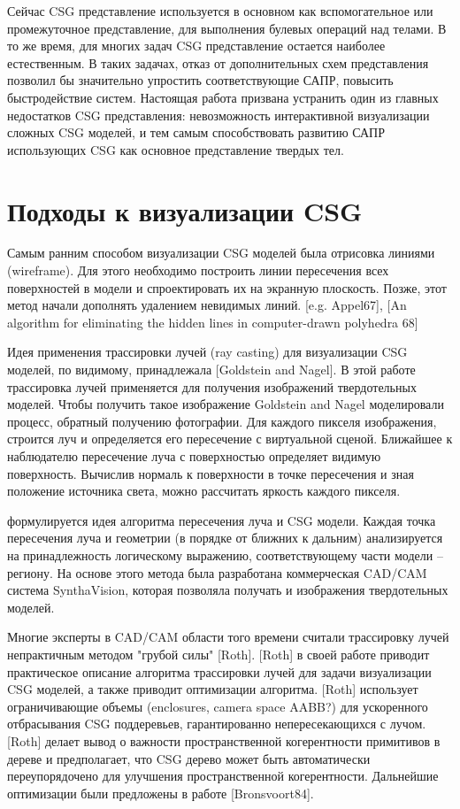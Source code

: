 {{{{{{Сейчас CSG представление используется в основном как вспомогательное или промежуточное представление, для выполнения булевых операций над телами. В то же время, для многих задач CSG представление остается наиболее естественным. В таких задачах, отказ от дополнительных схем представления позволил бы значительно упростить соответствующие САПР, повысить быстродействие систем. Настоящая работа призвана устранить один из главных недостатков CSG представления: невозможность интерактивной визуализации сложных CSG моделей, и тем самым способствовать развитию САПР использующих CSG как основное представление твердых тел.

\section{Подходы к визуализации CSG} \label{sect_csg_vis}

Самым ранним способом визуализации CSG моделей была отрисовка линиями (wireframe). Для этого необходимо построить линии пересечения всех поверхностей в модели и спроектировать их на экранную плоскость. Позже, этот метод начали дополнять удалением невидимых линий. [e.g. Appel67], [An algorithm for eliminating the hidden lines in computer-drawn polyhedra 68]

Идея применения трассировки лучей (ray casting) для визуализации CSG моделей, по видимому, принадлежала [Goldstein and Nagel]. В этой работе трассировка лучей применяется для получения  изображений твердотельных моделей. Чтобы получить такое изображение Goldstein and Nagel моделировали процесс, обратный получению фотографии. Для каждого пикселя изображения, строится луч и определяется его пересечение с виртуальной сценой. Ближайшее к наблюдателю пересечение луча с поверхностью определяет видимую поверхность. Вычислив нормаль к поверхности в точке пересечения и зная положение источника света, можно рассчитать яркость каждого пикселя. 

 формулируется идея алгоритма пересечения луча и CSG модели. Каждая точка пересечения луча и геометрии (в порядке от ближних к дальним) анализируется на принадлежность логическому выражению, соответствующему части модели -- региону. На основе этого метода была разработана коммерческая CAD/CAM система SynthaVision, которая позволяла получать  и  изображения твердотельных моделей.

Многие эксперты в CAD/CAM области того времени считали трассировку лучей непрактичным методом "грубой силы" [Roth]. [Roth] в своей работе приводит практическое описание алгоритма трассировки лучей для задачи визуализации CSG моделей, а также приводит оптимизации алгоритма. [Roth] использует ограничивающие объемы (enclosures, camera space AABB?) для ускоренного отбрасывания CSG поддеревьев, гарантированно непересекающихся с лучом. [Roth] делает вывод о важности пространственной когерентности примитивов в дереве и предполагает, что CSG дерево может быть автоматически переупорядочено для улучшения пространственной когерентности. Дальнейшие оптимизации были предложены в работе [Bronsvoort84].

}}}}}}
